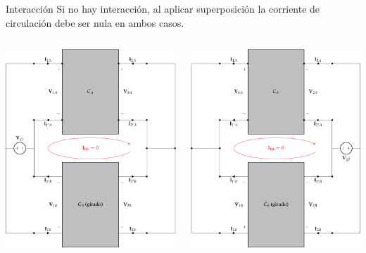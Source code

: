 \documentclass[xcolor={usenames,svgnames,dvipsnames}]{beamer}
\begin{document}
\begin{frame}[label={sec:org12088a9},plain]{Interacción}
Si no hay interacción, al aplicar superposición la corriente de circulación debe ser nula \alert{en ambos casos}.
\begin{columns}
\begin{column}{0.65\columnwidth}
\begin{center}
\includegraphics[width=.9\linewidth]{../figs/paralelo-paralelo-superposicion-entrada.pdf}
\end{center}
\end{column}
\begin{column}{0.65\columnwidth}
\begin{center}
\includegraphics[width=.9\linewidth]{../figs/paralelo-paralelo-superposicion-salida.pdf}

\end{center}
\end{column}
\end{columns}
\end{frame}
\end{document}
